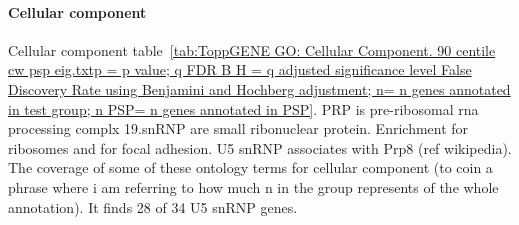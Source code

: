 \paragraph{Cellular component}
Cellular component table~\ref{tab:ToppGENE GO: Cellular Component. 90 centile cw psp eig.txtp = p value; q FDR B H = q adjusted significance level False Discovery Rate using Benjamini and Hochberg adjustment; n= n genes annotated in test group; n PSP= n genes annotated in PSP}. PRP is pre-ribosomal rna processing complx 19.snRNP are small ribonuclear protein. Enrichment for ribosomes and for focal adhesion. U5 snRNP associates with Prp8 (ref wikipedia). The coverage of some of these ontology terms for cellular component (to coin a phrase where i am referring to how much n in the group represents of the whole annotation). It finds 28 of 34 U5 snRNP genes. 

